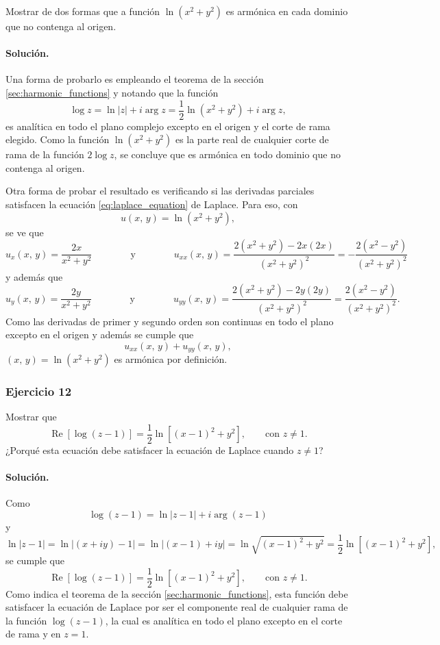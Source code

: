 \documentclass[a4paper]{report}
\renewcommand{\Re}{\operatorname{Re}}
\begin{document}
Mostrar de dos formas que a función \(\ln(x^2+y^2)\) es armónica en cada dominio que no contenga al origen.

\paragraph{Solución.} Una forma de probarlo es empleando el teorema de la sección \ref{sec:harmonic_functions} y notando que la función
\[
 \log z=\ln|z|+i\arg z=\frac{1}{2}\ln(x^2+y^2)+i\arg z,
\]
es analítica en todo el plano complejo excepto en el origen y el corte de rama elegido. Como la función \(\ln(x^2+y^2)\) es la parte real de cualquier corte de rama de la función \(2\log z\), se concluye que es armónica en todo dominio que no contenga al origen. 

Otra forma de probar el resultado es verificando si las derivadas parciales satisfacen la ecuación \ref{eq:laplace_equation} de Laplace. Para eso, con 
\[
 u(x,\,y)=\ln(x^2+y^2),
\]
se ve que 
\[
 u_x(x,\,y)=\frac{2x}{x^2+y^2}
 \qquad\qquad\textrm{y}\qquad\qquad 
 u_{xx}(x,\,y)=\frac{2(x^2+y^2)-2x(2x)}{(x^2+y^2)^2}=-\frac{2(x^2-y^2)}{(x^2+y^2)^2}
\]
y además que 
\[
 u_y(x,\,y)=\frac{2y}{x^2+y^2}
 \qquad\qquad\textrm{y}\qquad\qquad 
 u_{yy}(x,\,y)=\frac{2(x^2+y^2)-2y(2y)}{(x^2+y^2)^2}=\frac{2(x^2-y^2)}{(x^2+y^2)^2}.
\]
Como las derivadas de primer y segundo orden son continuas en todo el plano excepto en el origen  y además se cumple que 
\[
 u_{xx}(x,\,y)+u_{yy}(x,\,y),
\]
\((x,\,y)=\ln(x^2+y^2)\) es armónica por definición.

\subsubsection{Ejercicio 12}

Mostrar que 
\[
 \Re[\log(z-1)]=\frac{1}{2}\ln[(x-1)^2+y^2],\qquad\textrm{con }z\neq1.
\]
¿Porqué esta ecuación debe satisfacer la ecuación de Laplace cuando \(z\neq1\)?

\paragraph{Solución.} Como
\[
 \log(z-1)=\ln|z-1|+i\arg(z-1)
\]
y
\[
 \ln|z-1|=\ln|(x+iy)-1|=\ln|(x-1)+iy|=\ln\sqrt{(x-1)^2+y^2}=\frac{1}{2}\ln[(x-1)^2+y^2],
\]
se cumple que 
\[
 \Re[\log(z-1)]=\frac{1}{2}\ln[(x-1)^2+y^2],\qquad\textrm{con }z\neq1.
\]
Como indica el teorema de la sección \ref{sec:harmonic_functions}, esta función debe satisfacer la ecuación de Laplace por ser el componente real de cualquier rama de la función \(\log(z-1)\), la cual es analítica en todo el plano excepto en el corte de rama y en \(z=1\).
\end{document}

